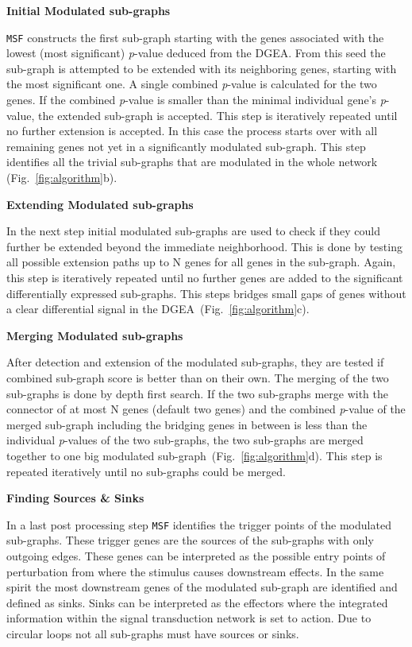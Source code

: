\documentclass[10pt,a4paper,twocolumn]{article}
\begin{document}
\textbf{Initial Modulated sub-graphs}

\texttt{MSF} constructs the first sub-graph starting with the genes
associated with the lowest (most significant) \textit{p}-value deduced from
the DGEA. From this seed the sub-graph is attempted to be extended with its
neighboring genes, starting with the most significant one. A single combined
\textit{p}-value is calculated for
the two genes. If the combined \textit{p}-value is smaller than the
minimal individual gene's \textit{p}-value, the extended sub-graph is
accepted. This step is iteratively repeated until no
further extension is accepted. In this case the process starts over
with all remaining genes not yet in a significantly modulated
sub-graph. This step identifies all the trivial sub-graphs that are
modulated in the whole network (Fig.~\ref{fig:algorithm}b).\newline

\textbf{Extending Modulated sub-graphs}

In the next step initial modulated sub-graphs are used to check if
they could further be extended beyond the immediate neighborhood.
This is done by testing all possible extension paths up to N genes
for all genes in the sub-graph. Again, this step is iteratively
repeated until no further genes are added to the significant
differentially expressed sub-graphs. This steps bridges small gaps of
genes without a clear differential signal in the
DGEA~(Fig.~\ref{fig:algorithm}c).\newline

\textbf{Merging Modulated sub-graphs}

After detection and extension of the modulated sub-graphs, they are
tested if combined sub-graph score is better than on their own. The
merging of the two sub-graphs is done by depth first search. If the
two sub-graphs merge with the connector of at most N genes (default
two genes) and the combined \textit{p}-value of the merged sub-graph
including the bridging genes in between is less than the individual
\textit{p}-values of the two sub-graphs, the two sub-graphs are merged
together to one big modulated sub-graph~(Fig.~\ref{fig:algorithm}d). This step is
repeated iteratively until no sub-graphs could be merged.\newline

\textbf{Finding Sources \& Sinks}

In a last post processing step \texttt{MSF} identifies the trigger
points of the modulated sub-graphs. These trigger genes are the
sources of the sub-graphs with only outgoing edges. These genes can be
interpreted as the possible entry points of perturbation from where
the stimulus causes downstream effects. In the same spirit the most
downstream genes of the modulated sub-graph are identified and defined
as sinks. Sinks can be interpreted as the effectors where the
integrated information within the signal transduction network is set
to action. Due to circular loops not all sub-graphs must have sources or
sinks.
\end{document}
